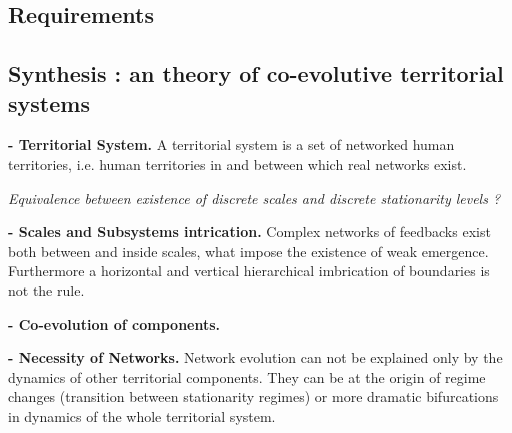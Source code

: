 \subsection{Requirements}




\subsection{Synthesis : an theory of co-evolutive territorial systems}



\begin{definition}
\textbf{ - Territorial System.} A territorial system is a set of networked human territories, i.e. human territories in and between which real networks exist.
\end{definition}


\textit{Equivalence between existence of discrete scales and discrete stationarity levels ?}


\begin{assumption}
\textbf{ - Scales and Subsystems intrication. } Complex networks of feedbacks exist both between and inside scales, what impose the existence of weak emergence. Furthermore a horizontal and vertical hierarchical imbrication of boundaries is not the rule.
\end{assumption}


\begin{proposition}
\textbf{ - Co-evolution of components. }

\end{proposition}



\begin{assumption}
\textbf{ - Necessity of Networks. } Network evolution can not be explained only by the dynamics of other territorial components. They can be at the origin of regime changes (transition between stationarity regimes) or more dramatic bifurcations in dynamics of the whole territorial system.
\end{assumption}


